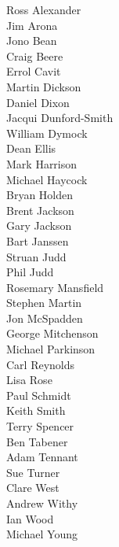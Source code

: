 \begin{contributors}
Ross Alexander \\
Jim Arona \\
Jono Bean \\
Craig Beere \\
Errol Cavit \\
Martin Dickson \\
Daniel Dixon \\
Jacqui Dunford-Smith \\
William Dymock \\
Dean Ellis \\
Mark Harrison \\
Michael Haycock \\
Bryan Holden \\
Brent Jackson \\
Gary Jackson \\
Bart Janssen \\
Struan Judd \\
Phil Judd \\
Rosemary Mansfield \\
Stephen Martin \\
Jon McSpadden \\
George Mitchenson \\
Michael Parkinson \\
Carl Reynolds \\
Lisa Rose \\
Paul Schmidt \\
Keith Smith \\
Terry Spencer \\
Ben Tabener \\
Adam Tennant \\
Sue Turner \\
Clare West \\
Andrew Withy \\
Ian Wood \\
Michael Young \\
\end{contributors}
